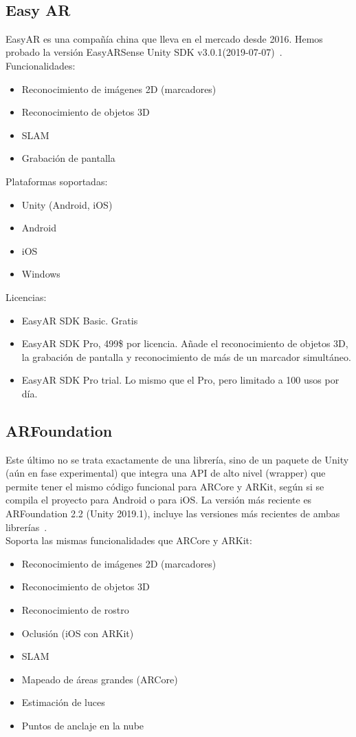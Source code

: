 \\

\subsection{Easy AR}


EasyAR es una compañía china que lleva en el mercado desde 2016. Hemos probado la versión EasyARSense Unity SDK v3.0.1(2019-07-07)~\cite{EasyAR}.\\

Funcionalidades:
\begin{itemize}
\item Reconocimiento de imágenes 2D (marcadores)
\item Reconocimiento de objetos 3D
\item SLAM
\item Grabación de pantalla
\end{itemize}
Plataformas soportadas:
\begin{itemize}
\item Unity (Android, iOS)
\item Android
\item iOS
\item Windows
\end{itemize}
Licencias:
\begin{itemize}
\item EasyAR SDK Basic. Gratis
\item EasyAR SDK Pro, 499\$ por licencia. Añade el reconocimiento de objetos 3D, la grabación de pantalla y reconocimiento de más de un marcador simultáneo.
\item EasyAR SDK Pro trial. Lo mismo que el Pro, pero limitado a 100 usos por día.
\end{itemize}


\subsection{ARFoundation}


Este último no se trata exactamente de una librería, sino de un paquete de Unity (aún en fase experimental) que integra una API de alto nivel (wrapper) que permite tener el mismo código funcional para ARCore y ARKit, según si se compila el proyecto para Android o para iOS. La versión más reciente es ARFoundation 2.2 (Unity 2019.1), incluye las versiones más recientes de ambas librerías~\cite{ARFoundation}.\\

Soporta las mismas funcionalidades que ARCore y ARKit:
\begin{itemize}
\item Reconocimiento de imágenes 2D (marcadores)
\item Reconocimiento de objetos 3D
\item Reconocimiento de rostro 
\item Oclusión (iOS con ARKit)
\item SLAM
\item Mapeado de áreas grandes (ARCore)
\item Estimación de luces
\item Puntos de anclaje en la nube
\end{itemize}

